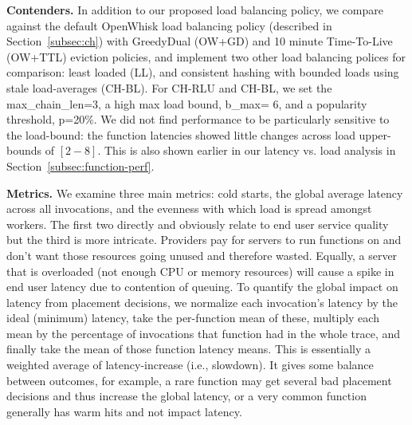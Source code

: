 \noindent \textbf{Contenders.}
In addition to our proposed load balancing policy, we compare against the default OpenWhisk load balancing policy (described in Section~\ref{subsec:ch}) with GreedyDual (OW+GD) and 10 minute Time-To-Live (OW+TTL) eviction policies, and implement two other load balancing polices for comparison: least loaded (LL), and consistent hashing with bounded loads using stale load-averages (CH-BL). 
For CH-RLU and CH-BL, we set the max\_chain\_len=3, a high max load bound, b\_max= 6, and a popularity threshold, p=20\%. 
We did not find performance to be particularly sensitive to the load-bound: the function latencies showed little changes across load upper-bounds of $[2-8]$. 
This is also shown earlier in our latency vs. load analysis in Section~\ref{subsec:function-perf}. 




\noindent \textbf{Metrics.}
We examine three main metrics: cold starts, the global average latency across all invocations, and the evenness with which load is spread amongst workers.
%
The first two directly and obviously relate to end user service quality but the third is more intricate. 
Providers pay for servers to run functions on and don't want those resources going unused and therefore wasted.
Equally, a server that is overloaded (not enough CPU or memory resources) will cause a spike in end user latency due to contention of queuing.
%
To quantify the global impact on latency from placement decisions, we normalize each invocation's latency by the ideal (minimum) latency, take the per-function mean of these, multiply each mean by the percentage of invocations that function had in the whole trace, and finally take the mean of those function latency means.
This is essentially a weighted average of latency-increase (i.e., slowdown).
It gives some balance between outcomes, for example, a rare function may get several bad placement decisions and thus increase the global latency, or a very common function generally has warm hits and not impact latency. 


